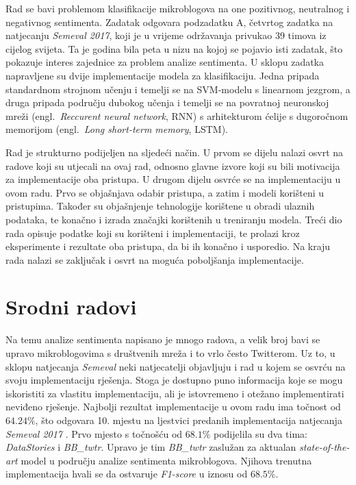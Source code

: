 \documentclass[times, utf8, zavrsni]{fer}
\begin{document}
Rad se bavi problemom klasifikacije mikroblogova na one pozitivnog, neutralnog i negativnog sentimenta. Zadatak odgovara podzadatku A, četvrtog zadatka na natjecanju \emph{Semeval 2017}, koji je u vrijeme održavanja privukao $39$ timova iz cijelog svijeta. Ta je godina bila peta u nizu na kojoj se pojavio isti zadatak, što pokazuje interes zajednice za problem analize sentimenta. U sklopu zadatka napravljene su dvije implementacije modela za klasifikaciju. Jedna pripada standardnom strojnom učenju i temelji se na \gls{SVM}-modelu s linearnom jezgrom, a druga pripada području dubokog učenja i temelji se na povratnoj neuronskoj mreži (engl.~\emph{Reccurent neural network}, \gls{RNN}) s arhitekturom ćelije s dugoročnom memorijom (engl.~\emph{Long short-term memory}, \gls{LSTM}).

Rad je strukturno podijeljen na sljedeći način. U prvom se dijelu nalazi osvrt na radove koji su utjecali na ovaj rad, odnosno glavne izvore koji su bili motivacija za implementacije oba pristupa. U drugom dijelu osvrće se na implementaciju u ovom radu. Prvo se objašnjava odabir pristupa, a zatim i modeli korišteni u pristupima. Također su objašnjenje tehnologije korištene u obradi ulaznih podataka, te konačno i izrada značajki korištenih u treniranju modela. Treći dio rada opisuje podatke koji su korišteni i implementaciji, te prolazi kroz eksperimente i rezultate oba pristupa, da bi ih konačno i usporedio. Na kraju rada nalazi se zaključak i osvrt na moguća poboljšanja implementacije.

\chapter{Srodni radovi}


Na temu analize sentimenta napisano je mnogo radova, a velik broj bavi se upravo mikroblogovima s društvenih mreža i to vrlo često Twitterom. Uz to, u sklopu natjecanja \emph{Semeval} neki natjecatelji objavljuju i rad u kojem se osvrću na svoju implementaciju rješenja. Stoga je dostupno puno informacija koje se mogu iskoristiti za vlastitu implementaciju, ali je istovremeno i otežano implementirati neviđeno rješenje. 
Najbolji rezultat implementacije u ovom radu ima točnost od $64.24\%$, što odgovara 10. mjestu na ljestvici predanih implementacija natjecanja \emph{Semeval 2017} \citep{semeval2017task4}. Prvo mjesto s točnošću od $68.1\%$ podijelila su dva tima: \textit{DataStories} i \textit{BB\_twtr}. Upravo je tim \textit{BB\_twtr} zaslužan za aktualan \textit{state-of-the-art} model u području analize sentimenta mikroblogova. Njihova trenutna implementacija hvali se da ostvaruje \textit{F1-score} u iznosu od $68.5\%$.
\end{document}
